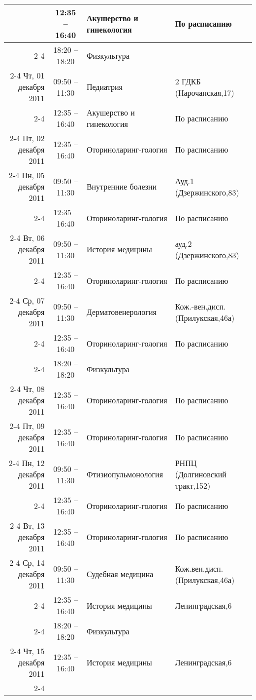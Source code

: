\documentclass[a4paper,10pt,notitlepage]{report}
\begin{document}
\begin{center}
{\begin{longtable}{r|c|l|l|}
  & 12:35 -- 16:40 & Акушерство и гинекология & По расписанию \\ \cline{2-4}
  & 18:20 -- 18:20 & Физкультура &  \\ \cline{2-4}
\hline Чт, 01 декабря 2011
  & 09:50 -- 11:30 & Педиатрия & 2 ГДКБ (Нарочанская,17) \\ \cline{2-4}
  & 12:35 -- 16:40 & Акушерство и гинекология & По расписанию \\ \cline{2-4}
\hline Пт, 02 декабря 2011
  & 12:35 -- 16:40 & Оториноларинг-гология & По расписанию \\ \cline{2-4}
\hline Пн, 05 декабря 2011
  & 09:50 -- 11:30 & Внутренние болезни & Ауд.1 (Дзержинского,83) \\ \cline{2-4}
  & 12:35 -- 16:40 & Оториноларинг-гология & По расписанию \\ \cline{2-4}
\hline Вт, 06 декабря 2011
  & 09:50 -- 11:30 & История медицины & ауд.2 (Дзержинского,83) \\ \cline{2-4}
  & 12:35 -- 16:40 & Оториноларинг-гология & По расписанию \\ \cline{2-4}
\hline Ср, 07 декабря 2011
  & 09:50 -- 11:30 & Дерматовенерология & Кож.-вен.дисп.(Прилукская,46а) \\ \cline{2-4}
  & 12:35 -- 16:40 & Оториноларинг-гология & По расписанию \\ \cline{2-4}
  & 18:20 -- 18:20 & Физкультура &  \\ \cline{2-4}
\hline Чт, 08 декабря 2011
  & 12:35 -- 16:40 & Оториноларинг-гология & По расписанию \\ \cline{2-4}
\hline Пт, 09 декабря 2011
  & 12:35 -- 16:40 & Оториноларинг-гология & По расписанию \\ \cline{2-4}
\hline Пн, 12 декабря 2011
  & 09:50 -- 11:30 & Фтизиопульмонология & РНПЦ (Долгиновский тракт,152) \\ \cline{2-4}
  & 12:35 -- 16:40 & Оториноларинг-гология & По расписанию \\ \cline{2-4}
\hline Вт, 13 декабря 2011
  & 12:35 -- 16:40 & Оториноларинг-гология & По расписанию \\ \cline{2-4}
\hline Ср, 14 декабря 2011
  & 09:50 -- 11:30 & Судебная медицина & Кож.вен.дисп.(Прилукская,46а) \\ \cline{2-4}
  & 12:35 -- 16:40 & История медицины & Ленинградская,6 \\ \cline{2-4}
  & 18:20 -- 18:20 & Физкультура &  \\ \cline{2-4}
\hline Чт, 15 декабря 2011
  & 12:35 -- 16:40 & История медицины & Ленинградская,6 \\ \cline{2-4}

\end{longtable}}
\end{center}
\end{document}
